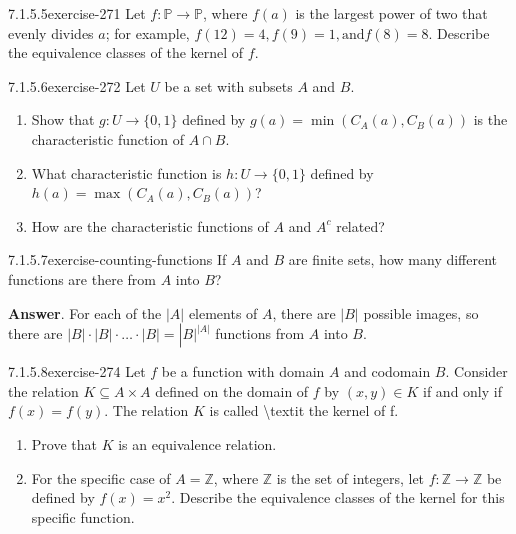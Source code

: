 \documentclass[twoside,10pt,]{book}
\numberwithin{equation}{section}
\begin{document}
\begin{divisionsolution}{7.1.5.5}{}{exercise-271}%
\hypertarget{p-2301}{}%
Let \(f:\mathbb{P}\to \mathbb{P}\), where \(f(a)\) is the largest power of two that evenly divides \(a\); for example, \(f(12)=4,f(9)=1,\text{and}
f(8)=8\). Describe the equivalence classes of the kernel of \(f\).%
\end{divisionsolution}%
\begin{divisionsolution}{7.1.5.6}{}{exercise-272}%
\hypertarget{p-2302}{}%
Let \(U\) be a set with subsets \(A\) and \(B\).%
\par
\hypertarget{p-2303}{}%
\leavevmode%
\begin{enumerate}[label=(\alph*)]
\item\hypertarget{li-1195}{}\hypertarget{p-2304}{}%
Show that \(g:U\to \{0,1\}\) defined by \(g(a)=\min \left(C_A(a),C_B(a)\right)\) is the characteristic function of \(A\cap B\).%
\item\hypertarget{li-1196}{}\hypertarget{p-2305}{}%
What characteristic function is \(h:U\to \{0,1\}\) defined by \(h(a)=\max \left(C_A(a),C_B(a)\right)\)?%
\item\hypertarget{li-1197}{}\hypertarget{p-2306}{}%
How are the characteristic functions of \(A\) and \(A^c\) related?%
\end{enumerate}
%
\end{divisionsolution}%
\begin{divisionsolution}{7.1.5.7}{}{exercise-counting-functions}%
\hypertarget{p-2307}{}%
If \(A\) and \(B\) are finite sets, how many different functions are there from \(A\) into \(B\)?%
\par\smallskip%
\noindent\textbf{Answer}.\quad%
\hypertarget{p-2308}{}%
For each of the \(\lvert A \rvert \) elements of \(A\), there are \(\lvert B \rvert\) possible images, so there are \(\lvert B \rvert\cdot \lvert B \rvert\cdot \ldots \cdot \lvert B \rvert=\left\lvert B \rvert^{\lvert A \rvert}\right.\) functions from \(A\) into \(B\).%
\end{divisionsolution}%
\begin{divisionsolution}{7.1.5.8}{}{exercise-274}%
\hypertarget{p-2309}{}%
Let \(f\) be a function with domain \(A\) and codomain \(B\). Consider the relation \(K \subseteq  A \times  A\) defined on the domain of \(f\) by \((x, y) \in  K\) if and only if \(f(x) = f(y)\). The relation \(K\) is called \textbackslash{}textit\textbraceleft{} the kernel of f\textbraceright{}.%
\par
\hypertarget{p-2310}{}%
\leavevmode%
\begin{enumerate}[label=(\alph*)]
\item\hypertarget{li-1198}{}\hypertarget{p-2311}{}%
Prove that \(K\) is an equivalence relation.%
\item\hypertarget{li-1199}{}\hypertarget{p-2312}{}%
For the specific case of \(A = \mathbb{Z}\), where \(\mathbb{Z}\) is the set of integers, let \(f: \mathbb{Z} \rightarrow  \mathbb{Z}\) be defined by \(f(x) = x^2\). Describe the equivalence classes of the kernel for this specific function.%
\end{enumerate}
%
\end{divisionsolution}%
\end{document}
